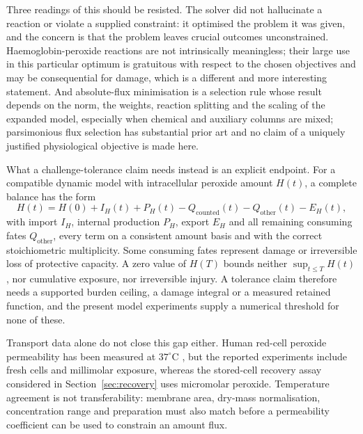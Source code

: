 \documentclass[11pt,a4paper]{article}
\theoremstyle{plain}
\theoremstyle{definition}
\theoremstyle{remark}
\begin{document}
Three readings of this should be resisted. The solver did not hallucinate a
reaction or violate a supplied constraint: it optimised the problem it was
given, and the concern is that the problem leaves crucial outcomes
unconstrained. Haemoglobin-peroxide reactions are not intrinsically
meaningless; their large use in this particular optimum is gratuitous with
respect to the chosen objectives and may be consequential for damage, which is
a different and more interesting statement. And absolute-flux minimisation is a
selection rule whose result depends on the norm, the weights, reaction
splitting and the scaling of the expanded model, especially when chemical and
auxiliary columns are mixed; parsimonious flux selection has substantial prior
art \citep{lewis2010} and no claim of a uniquely justified physiological
objective is made here.

What a challenge-tolerance claim needs instead is an explicit endpoint. For a
compatible dynamic model with intracellular peroxide amount $H(t)$, a complete
balance has the form
\begin{equation}\label{eq:burden}
H(t)=H(0)+I_H(t)+P_H(t)-Q_{\text{counted}}(t)-Q_{\text{other}}(t)-E_H(t),
\end{equation}
with import $I_H$, internal production $P_H$, export $E_H$ and all remaining
consuming fates $Q_{\text{other}}$, every term on a consistent amount basis and
with the correct stoichiometric multiplicity. Some consuming fates represent
damage or irreversible loss of protective capacity. A zero value of $H(T)$
bounds neither $\sup_{t\le T}H(t)$, nor cumulative exposure, nor irreversible
injury. A tolerance claim therefore needs a supported burden ceiling, a damage
integral or a measured retained function, and the present model experiments
supply a numerical threshold for none of these.

Transport data alone do not close this gap either. Human red-cell peroxide
permeability has been measured at $37^{\circ}$C \citep{orrico2022}, but the
reported experiments include fresh cells and millimolar exposure, whereas the
stored-cell recovery assay considered in Section~\ref{sec:recovery} uses
micromolar peroxide. Temperature agreement is not transferability: membrane
area, dry-mass normalisation, concentration range and preparation must also
match before a permeability coefficient can be used to constrain an amount
flux.
\end{document}
